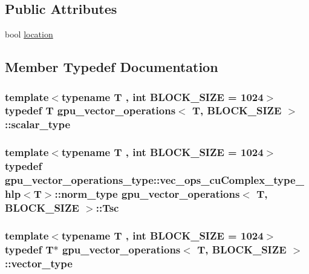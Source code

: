 \subsection*{Public Attributes}
\begin{DoxyCompactItemize}
\item 
bool \hyperlink{structgpu__vector__operations_abff92b3240864d39244e5cdfe43ec048}{location}
\end{DoxyCompactItemize}


\subsection{Member Typedef Documentation}
\hypertarget{structgpu__vector__operations_aaa9d1dc877967fabc2262c4a25e4796f}{
\subsubsection[{scalar\-\_\-type}]{\setlength{\rightskip}{0pt plus 5cm}template$<$typename T , int B\-L\-O\-C\-K\-\_\-\-S\-I\-Z\-E = 1024$>$ typedef T {\bf gpu\-\_\-vector\-\_\-operations}$<$ T, B\-L\-O\-C\-K\-\_\-\-S\-I\-Z\-E $>$\-::{\bf scalar\-\_\-type}}}\label{structgpu__vector__operations_aaa9d1dc877967fabc2262c4a25e4796f}
\hypertarget{structgpu__vector__operations_a1a029004898ae03eae1de4c8c8f4f824}{
\subsubsection[{Tsc}]{\setlength{\rightskip}{0pt plus 5cm}template$<$typename T , int B\-L\-O\-C\-K\-\_\-\-S\-I\-Z\-E = 1024$>$ typedef {\bf gpu\-\_\-vector\-\_\-operations\-\_\-type\-::vec\-\_\-ops\-\_\-cu\-Complex\-\_\-type\-\_\-hlp}$<$T$>$\-::norm\-\_\-type {\bf gpu\-\_\-vector\-\_\-operations}$<$ T, B\-L\-O\-C\-K\-\_\-\-S\-I\-Z\-E $>$\-::{\bf Tsc}}}\label{structgpu__vector__operations_a1a029004898ae03eae1de4c8c8f4f824}
\hypertarget{structgpu__vector__operations_adfa9fd444da5616e33af37604dc206ba}{
\subsubsection[{vector\-\_\-type}]{\setlength{\rightskip}{0pt plus 5cm}template$<$typename T , int B\-L\-O\-C\-K\-\_\-\-S\-I\-Z\-E = 1024$>$ typedef T$\ast$ {\bf gpu\-\_\-vector\-\_\-operations}$<$ T, B\-L\-O\-C\-K\-\_\-\-S\-I\-Z\-E $>$\-::{\bf vector\-\_\-type}}}\label{structgpu__vector__operations_adfa9fd444da5616e33af37604dc206ba}


